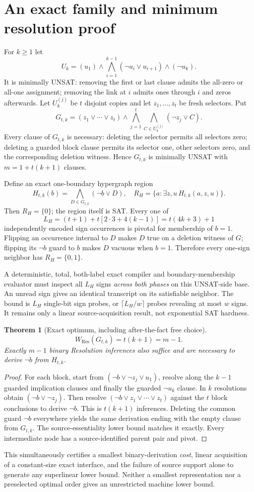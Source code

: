 \documentclass[11pt]{article}
\newtheorem{theorem}{Theorem}
\begin{document}
\section{An exact family and minimum resolution proof}
For $k\ge1$ let
\[
U_k=(u_1)\wedge\bigwedge_{i=1}^{k-1}(\neg u_i\vee u_{i+1})\wedge(\neg u_k).
\]
It is minimally UNSAT: removing the first or last clause admits the all-zero or all-one assignment; removing the link at $i$ admits ones through $i$ and zeros afterwards. Let $U_k^{(j)}$ be $t$ disjoint copies and let $z_1,\ldots,z_t$ be fresh selectors. Put
\[
G_{t,k}=(z_1\vee\cdots\vee z_t)\wedge
\bigwedge_{j=1}^{t}\bigwedge_{C\in U_k^{(j)}}(\neg z_j\vee C).
\]
Every clause of $G_{t,k}$ is necessary: deleting the selector permits all selectors zero; deleting a guarded block clause permits its selector one, other selectors zero, and the corresponding deletion witness. Hence $G_{t,k}$ is minimally UNSAT with $m=1+t(k+1)$ clauses.

Define an exact one-boundary hypergraph region
\[
H_{t,k}(b)=\bigwedge_{D\in G_{t,k}}(\neg b\vee D),\quad
R_H=\{a:\exists z,u\,H_{t,k}(a,z,u)\}.
\]
Then $R_H=\{0\}$; the region itself is SAT. Every one of
\[
L_H=(t+1)+t[2\cdot3+4(k-1)]=t(4k+3)+1
\]
independently encoded sign occurrences is pivotal for membership of $b=1$. Flipping an occurrence internal to $D$ makes $D$ true on a deletion witness of $G$; flipping its $\neg b$ guard to $b$ makes $D$ vacuous when $b=1$. Therefore every one-sign neighbor has $R_H=\{0,1\}$.

A deterministic, total, both-label exact compiler and boundary-membership evaluator must inspect all $L_H$ signs \emph{across both phases} on this UNSAT-side base. An unread sign gives an identical transcript on its satisfiable neighbor. The bound is $L_H$ single-bit sign probes, or $\lceil L_H/w\rceil$ probes revealing at most $w$ signs. It remains only a linear source-acquisition result, not exponential SAT hardness.

\begin{theorem}[Exact optimum, including after-the-fact free choice]
\[
\boxed{W_{\mathrm{Res}}(G_{t,k})=t(k+1)=m-1}.
\]
Exactly $m-1$ binary Resolution inferences also suffice and are necessary to derive $\neg b$ from $H_{t,k}$.
\end{theorem}
\begin{proof}
For each block, start from $(\neg b\vee\neg z_j\vee u_1)$, resolve along the $k-1$ guarded implication clauses and finally the guarded $\neg u_k$ clause. In $k$ resolutions obtain $(\neg b\vee\neg z_j)$. Then resolve $(\neg b\vee z_1\vee\cdots\vee z_t)$ against the $t$ block conclusions to derive $\neg b$. This is $t(k+1)$ inferences. Deleting the common guard $\neg b$ everywhere yields the same derivation ending with the empty clause from $G_{t,k}$. The source-essentiality lower bound matches it exactly. Every intermediate node has a source-identified parent pair and pivot.
\end{proof}
This simultaneously certifies a smallest binary-derivation \emph{cost}, linear acquisition of a constant-size exact interface, and the failure of source support alone to generate any superlinear lower bound. Neither a smallest representation nor a preselected optimal order gives an unrestricted machine lower bound.
\end{document}
